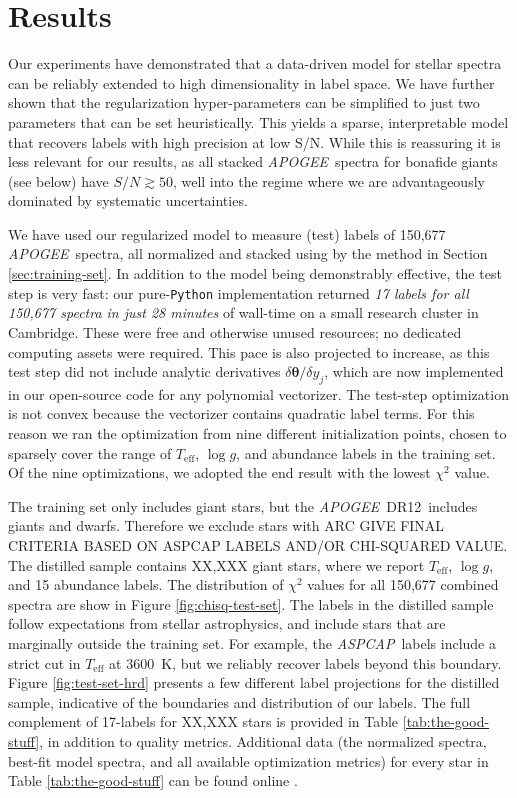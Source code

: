 \documentclass[12pt,preprint]{aastex}
\newcommand{\project}[1]{\textsl{#1}}
\newcommand{\acronym}[1]{{\small{#1}}}
\newcommand{\apogee}{\project{\acronym{APOGEE}}}
\newcommand{\aspcap}{\project{\acronym{ASPCAP}}}
\newcommand{\dr}{\acronym{DR12}}
\newcommand{\logg}{\log g}
\newcommand{\Teff}{T_{\mathrm{eff}}}
\newcommand{\Dvector}[1]{\boldsymbol{#1}}
\newcommand{\vectheta}{\Dvector{\theta}}
\begin{document}
\section{Results}
\label{sec:results}


Our experiments have demonstrated that a data-driven model for stellar spectra
can be reliably extended to high dimensionality in label space.  We have further
shown that the regularization hyper-parameters can be simplified to just two
parameters that can be set heuristically.  This yields a sparse, interpretable 
model that recovers labels with high precision at low S/N.  While this is 
reassuring it is less relevant for our results, as all stacked \apogee\
spectra for bonafide giants (see below) have $S/N \gtrsim 50$, well into the 
regime where we are advantageously dominated by systematic uncertainties.


We have used our regularized model to measure (test) labels of 150,677 \apogee\ 
spectra, all normalized and stacked using by the method in Section 
\ref{sec:training-set}.  In addition to the model being demonstrably effective,
the test step is very fast: our pure-\texttt{Python} implementation returned 
\emph{17 labels for all 150,677 spectra in just 28 minutes} of wall-time 
on a small research cluster in Cambridge.  These were free 
and otherwise unused resources; no dedicated computing assets were required.  
This pace is also projected to increase, as this test step did not include 
analytic derivatives $\delta\vectheta/\delta{}y_j$, which are now implemented
in our open-source code for any polynomial vectorizer.  The test-step 
optimization is not convex because the vectorizer contains
quadratic label terms.  For this reason we ran the optimization from nine
different initialization points, chosen to sparsely cover the range of
$\Teff$, $\logg$, and abundance labels in the training set.  Of the nine
optimizations, we adopted the end result with the lowest $\chi^2$ value.


The training set only includes giant stars, but the \apogee\ \dr\ includes 
giants and dwarfs.  Therefore we exclude stars with 
ARC GIVE FINAL CRITERIA BASED ON ASPCAP LABELS AND/OR CHI-SQUARED VALUE.
The distilled sample contains XX,XXX giant stars, where we report $\Teff$,
$\logg$, and 15 abundance labels.  The distribution of $\chi^2$ values for
all 150,677 combined spectra are show in Figure \ref{fig:chisq-test-set}.  The
labels in the distilled sample follow expectations from stellar astrophysics,
and include stars that are marginally outside the training set.  For example,
the \aspcap\ labels include a strict cut in $\Teff$ at 3600~K, but we reliably
recover labels beyond this boundary.  Figure \ref{fig:test-set-hrd} presents a
few different label projections for the distilled sample, indicative of the
boundaries and distribution of our labels.  The full complement of 17-labels
for XX,XXX stars is provided in Table \ref{tab:the-good-stuff}, in addition
to quality metrics.  Additional data (the normalized spectra, best-fit model
spectra, and all available optimization metrics) for every star in Table 
\ref{tab:the-good-stuff} can be found online \citet{Zenodo}.
\end{document}
